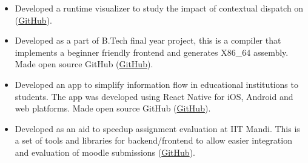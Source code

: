 \begin{itemize}
\item Developed a runtime visualizer to study the impact of contextual dispatch on \rsh{} (\href{https://github.com/CompL-Research/rsh-wiz}{GitHub}).
\end{itemize}
\begin{itemize}
\item Developed as a part of B.Tech final year project, this is a compiler that implements a beginner friendly frontend and generates X86\_64 assembly. Made open source GitHub (\href{https://github.com/meetesh06/xope_4.2}{GitHub}).
\end{itemize}
\smallskip
{}
\begin{itemize}
\item Developed an app to simplify information flow in educational institutions to students. The app was developed using React Native for iOS, Android and web platforms. Made open source GitHub (\href{https://github.com/meetesh06/CampusStory}{GitHub}).
\end{itemize}
\smallskip
{}
\begin{itemize}
\item Developed as an aid to speedup assignment evaluation at IIT Mandi. This is a set of tools and libraries for backend/frontend to allow easier integration and evaluation of moodle submissions (\href{https://github.com/CompL-Research/CompL-Evaluator-Backend}{GitHub}).

\end{itemize}

